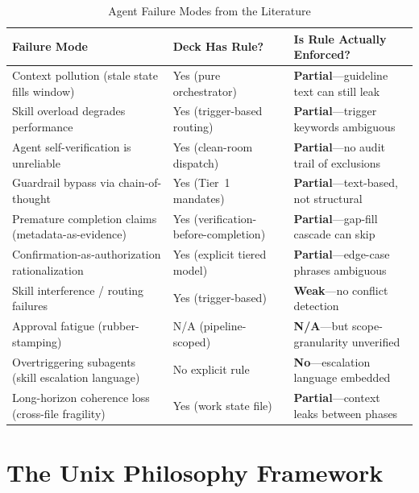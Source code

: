 \documentclass[11pt,a4paper]{article}
\begin{document}
\begin{table}[htbp]
\centering
\caption{Agent Failure Modes from the Literature}
\label{tab:failures}
\small
\begin{tabular}{@{}p{4cm}p{4cm}p{5cm}@{}}
\toprule
\textbf{Failure Mode} & \textbf{Deck Has Rule?} & \textbf{Is Rule Actually Enforced?} \\
\midrule
Context pollution (stale state fills window)               & Yes (pure orchestrator) & \textbf{Partial}---guideline text can still leak \\
\midrule
Skill overload degrades performance                        & Yes (trigger-based routing) & \textbf{Partial}---trigger keywords ambiguous \\
\midrule
Agent self-verification is unreliable                      & Yes (clean-room dispatch) & \textbf{Partial}---no audit trail of exclusions \\
\midrule
Guardrail bypass via chain-of-thought                      & Yes (Tier~1 mandates) & \textbf{Partial}---text-based, not structural \\
\midrule
Premature completion claims (metadata-as-evidence)         & Yes (verification-before-completion) & \textbf{Partial}---gap-fill cascade can skip \\
\midrule
Confirmation-as-authorization rationalization              & Yes (explicit tiered model) & \textbf{Partial}---edge-case phrases ambiguous \\
\midrule
Skill interference / routing failures                      & Yes (trigger-based) & \textbf{Weak}---no conflict detection \\
\midrule
Approval fatigue (rubber-stamping)                         & N/A (pipeline-scoped) & \textbf{N/A}---but scope-granularity unverified \\
\midrule
Overtriggering subagents (skill escalation language)       & No explicit rule & \textbf{No}---escalation language embedded \\
\midrule
Long-horizon coherence loss (cross-file fragility)         & Yes (work state file) & \textbf{Partial}---context leaks between phases \\
\bottomrule
\end{tabular}
\end{table}

\newpage

\section{The Unix Philosophy Framework}
\end{document}
